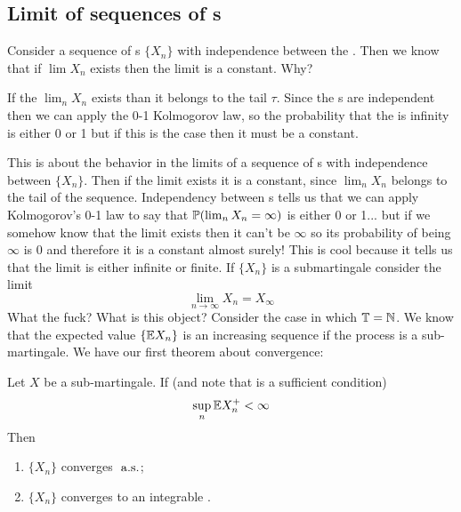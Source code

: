 \documentclass{report}
\begin{document}
\subsection{Limit of sequences of \rv s}
Consider a sequence of \rv s $\{X_{n}\}$ with independence between the \rv. Then we know that if $\lim X_{n}$ exists then the limit is a constant. Why?
\begin{remark}
	If the $\lim_{n}X_{n}$ exists than it belongs to the tail \sa{} $\tau$. Since the \rv s are independent then we can apply the 0-1 Kolmogorov law, so the probability that the \rv{} is infinity is either 0 or 1 but if this is the case then it must be a constant.
\end{remark}
This is about the behavior in the limits of a sequence of \rv s with independence between $\{X_{n}\}$. Then if the limit exists it is a constant, since $\lim_{n}X_{n}$ belongs to the tail \sa{} of the sequence. Independency between \rv s tells us that we can apply Kolmogorov's 0-1 law to say that $\mathbb{P}(\lim_{n}X_{n}=\infty)$ is either 0 or 1... but if we somehow know that the limit exists then it can't be $\infty$ so its probability of being $\infty$ is 0 and therefore it is a constant almost surely! This is cool because it tells us that the limit is either infinite or finite.
If $\{X_{n}\}$ is a submartingale consider the limit 
\begin{equation*}
	\lim_{n\to\infty}X_{n}=X_{\infty}
\end{equation*}
What the fuck? What is this object? Consider the case in which $\mathbb{T}=\mathbb{N}$. We know that the expected value $\{\mathbb{E} X_{n}\}$ is an increasing sequence if the process is a sub-martingale. 
We have our first theorem about convergence:
\begin{theorem}
	Let $X$ be a sub-martingale. If (and note that is a sufficient condition)
	\begin{equation*}
		\sup_{n}\mathbb{E} X_{n}^{+}<\infty
	\end{equation*}
	Then
	\begin{enumerate}
		\item $\{X_{n}\}$ converges $\text{ a.s.}$;
		\item $\{X_{n}\}$ converges to an integrable \rv.
	\end{enumerate}
\end{theorem}
\end{document}

